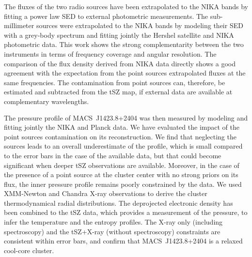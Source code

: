 \documentclass[twocolumn,traditabstract]{aa}
\begin{document}
The fluxes of the two radio sources have been extrapolated to the NIKA bands by fitting a power law SED to external photometric measurements. The sub-millimeter sources were extrapolated to the NIKA bands by modeling their SED with a grey-body spectrum and fitting jointly the Hershel satellite and NIKA photometric data. This work shows the strong complementarity between the two instruments in terms of frequency coverage and angular resolution. The comparison of the flux density derived from NIKA data directly shows a good agreement with the expectation from the point sources extrapolated fluxes at the same frequencies. The contamination from point sources can, therefore, be estimated and subtracted from the tSZ map, if external data are available at complementary wavelengths.

The pressure profile of \mbox{MACS~J1423.8+2404} was then measured by modeling and fitting jointly the NIKA and Planck data. We have evaluated the impact of the point sources contamination on its reconstruction. We find that neglecting the sources leads to an overall underestimate of the profile, which is small compared to the error bars in the case of the available data, but that could become significant when deeper tSZ observations are available. Moreover, in the case of the presence of a point source at the cluster center with no strong priors on its flux, the inner pressure profile remains poorly constrained by the data. We used XMM-Newton and Chandra X-ray observations to derive the cluster thermodynamical radial distributions. The deprojected electronic density has been combined to the tSZ data, which provides a measurement of the pressure, to infer the temperature and the entropy profiles. The X-ray only (including spectroscopy) and the tSZ+X-ray (without spectroscopy) constraints are consistent within error bars, and confirm that \mbox{MACS~J1423.8+2404} is a relaxed cool-core cluster.

\end{document}
